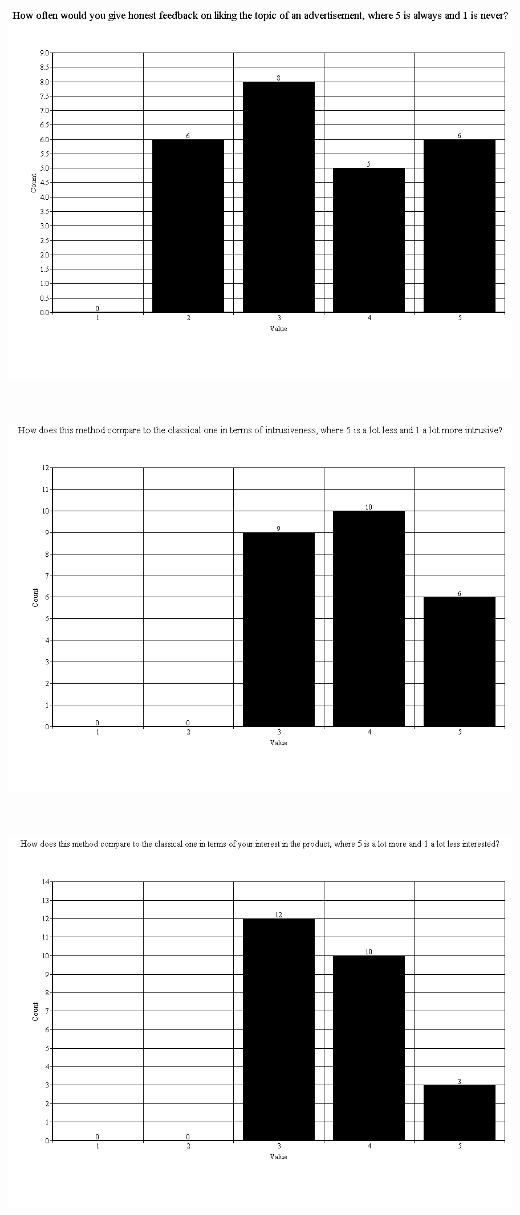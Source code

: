 \documentclass[twoside,11pt]{Latex/Classes/PhDthesisPSnPDF}
\begin{document}
\chapter{}
\includegraphics[scale=0.5]{Images/q9}
\chapter{}
\includegraphics[scale=0.5]{Images/q11}
\chapter{}
\includegraphics[scale=0.5]{Images/q12}
\end{document}
